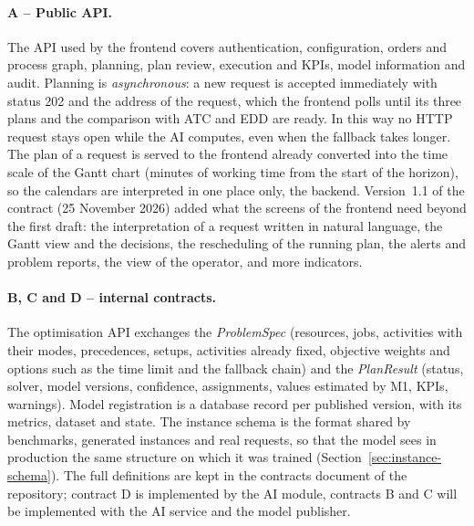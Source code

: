 \paragraph{A -- Public API.} The API used by the frontend covers authentication, configuration,
orders and process graph, planning, plan review, execution and KPIs, model information and audit.
Planning is \emph{asynchronous}: a new request is accepted immediately with status 202 and the
address of the request, which the frontend polls until its three plans and the comparison with
ATC and EDD are ready. In this way no HTTP request stays open while the AI computes, even when the
fallback takes longer. The plan of a request is served to the frontend already converted into the
time scale of the Gantt chart (minutes of working time from the start of the horizon), so the
calendars are interpreted in one place only, the backend. Version~1.1 of the contract (25
November 2026) added what the screens of the frontend need beyond the first draft: the
interpretation of a request written in natural language, the Gantt view and the decisions, the
rescheduling of the running plan, the alerts and problem reports, the view of the operator, and
more indicators.

\paragraph{B, C and D -- internal contracts.} The optimisation API exchanges the
\emph{ProblemSpec} (resources, jobs, activities with their modes, precedences, setups, activities
already fixed, objective weights and options such as the time limit and the fallback chain) and
the \emph{PlanResult} (status, solver, model versions, confidence, assignments, values estimated
by M1, KPIs, warnings). Model registration is a database record per published version, with its
metrics, dataset and state. The instance schema is the format shared by benchmarks, generated
instances and real requests, so that the model sees in production the same structure on which it
was trained (Section~\ref{sec:instance-schema}). The full definitions are kept in the contracts
document of the repository; contract D is implemented by the AI module, contracts B and C will be
implemented with the AI service and the model publisher.


